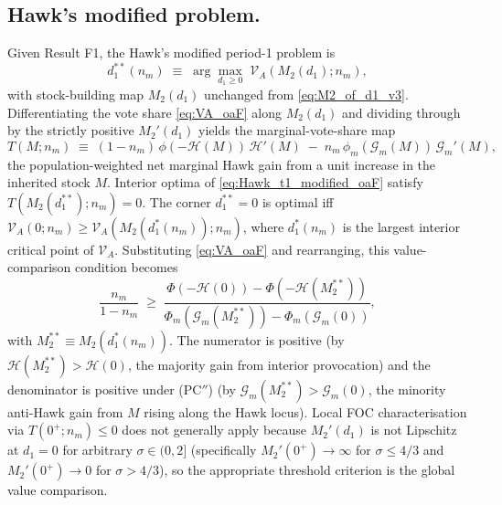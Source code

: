 \documentclass[11pt,twoside]{extarticle}
\begin{document}
\subsection*{Hawk's modified problem.} Given Result F1, the Hawk's modified period-1 problem is
\begin{equation}\label{eq:Hawk_t1_modified_oaF}
    d_1^{**}(n_m)\;\equiv\;\arg\max_{d_1\ge 0}\;\mathcal V_A(M_2(d_1);n_m),
\end{equation}
with stock-building map $M_2(d_1)$ unchanged from \eqref{eq:M2_of_d1_v3}. Differentiating the vote share \eqref{eq:VA_oaF} along $M_2(d_1)$ and dividing through by the strictly positive $M_2'(d_1)$ yields the marginal-vote-share map
\begin{equation}\label{eq:T_map_oaF}
    T(M;n_m)\;\equiv\;(1-n_m)\,\phi(-\mathcal H(M))\,\mathcal H'(M)\;-\;n_m\,\phi_m(\mathcal G_m(M))\,\mathcal G_m'(M),
\end{equation}
the population-weighted net marginal Hawk gain from a unit increase in the inherited stock $M$. Interior optima of \eqref{eq:Hawk_t1_modified_oaF} satisfy $T(M_2(d_1^{**});n_m)=0$. The corner $d_1^{**}=0$ is optimal iff $\mathcal V_A(0;n_m)\ge\mathcal V_A(M_2(d_1^{*}(n_m));n_m)$, where $d_1^{*}(n_m)$ is the largest interior critical point of $\mathcal V_A$. Substituting \eqref{eq:VA_oaF} and rearranging, this value-comparison condition becomes
\begin{equation}\label{eq:corner_threshold_oaF}
    \frac{n_m}{1-n_m}\;\ge\;\frac{\Phi(-\mathcal H(0))-\Phi(-\mathcal H(M_2^{**}))}{\Phi_m(\mathcal G_m(M_2^{**}))-\Phi_m(\mathcal G_m(0))},
\end{equation}
with $M_2^{**}\equiv M_2(d_1^{*}(n_m))$. The numerator is positive (by $\mathcal H(M_2^{**})>\mathcal H(0)$, the majority gain from interior provocation) and the denominator is positive under (PC$''$) (by $\mathcal G_m(M_2^{**})>\mathcal G_m(0)$, the minority anti-Hawk gain from $M$ rising along the Hawk locus). Local FOC characterisation via $T(0^+;n_m)\le 0$ does not generally apply because $M_2'(d_1)$ is not Lipschitz at $d_1=0$ for arbitrary $\sigma\in(0,2]$ (specifically $M_2'(0^+)\to\infty$ for $\sigma\le 4/3$ and $M_2'(0^+)\to 0$ for $\sigma>4/3$), so the appropriate threshold criterion is the global value comparison.
\end{document}
